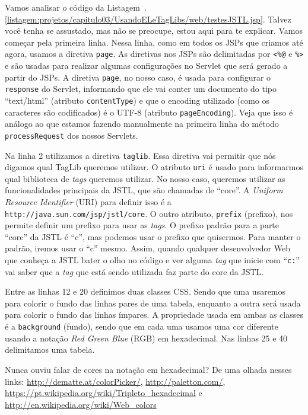 Vamos analisar o código da Listagem~\thechapter.\ref{listagem:projetos/capitulo03/UsandoELeTagLibs/web/testesJSTL.jsp}. Talvez você tenha se assustado, mas não se preocupe, estou aqui para te explicar. Vamos começar pela primeira linha. Nessa linha, como em todos os JSPs que criamos até agora, usamos a diretiva \texttt{page}. As diretivas nos JSPs são delimitadas por \texttt{<\%@} e \texttt{\%>} e são usadas para realizar algumas configurações no Servlet que será gerado a partir do JSPs. A diretiva \texttt{page}, no nosso caso, é usada para configurar o \texttt{response} do Servlet, informando que ele vai conter um documento do tipo ``text/html'' (atributo \texttt{contentType}) e que o encoding utilizado (como os caracteres são codificados) é o UTF-8 (atributo \texttt{pageEncoding}). Veja que isso é análogo ao que estamos fazendo manualmente na primeira linha do método \texttt{processRequest} dos nossos Servlets.

Na linha 2 utilizamos a diretiva \texttt{taglib}. Essa diretiva vai permitir que nós digamos qual TagLib queremos utilizar. O atributo \texttt{uri} é usado para informarmos qual biblioteca de \textit{tags} queremos utilizar. No nosso caso, queremos utilizar as funcionalidades principais da JSTL, que são chamadas de ``core''. A \textit{Uniform Resource Identifier} (URI) para definir isso é a \texttt{http://java.sun.com/jsp/jstl/core}. O outro atributo, \texttt{prefix} (prefixo), nos permite definir um prefixo para usar as \textit{tags}. O prefixo padrão para a parte ``core'' da JSTL é ``c'', mas podemos usar o prefixo que quisermos. Para manter o padrão, iremos usar o ``c'' mesmo. Assim, quando qualquer desenvolvedor Web que conheça a JSTL bater o olho no código e ver alguma \textit{tag} que inicie com ``\texttt{c:}'' vai saber que a \textit{tag} que está sendo utilizada faz parte do core da JSTL.

Entre as linhas 12 e 20 definimos duas classes CSS. Sendo que uma usaremos para colorir o fundo das linhas pares de uma tabela, enquanto a outra será usada para colorir o fundo das linhas ímpares. A propriedade usada em ambas as classes é a \texttt{background} (fundo), sendo que em cada uma usamos uma cor diferente usando a notação \textit{Red Green Blue} (RGB) em hexadecimal. Nas linhas 25 e 40 delimitamos uma tabela.

\begin{saibaMais}
    Nunca ouviu falar de cores na notação em hexadecimal? De uma olhada nesses links: \url{http://dematte.at/colorPicker/}, \url{http://paletton.com/}, \url{https://pt.wikipedia.org/wiki/Tripleto_hexadecimal} e \url{http://en.wikipedia.org/wiki/Web_colors}
\end{saibaMais}

